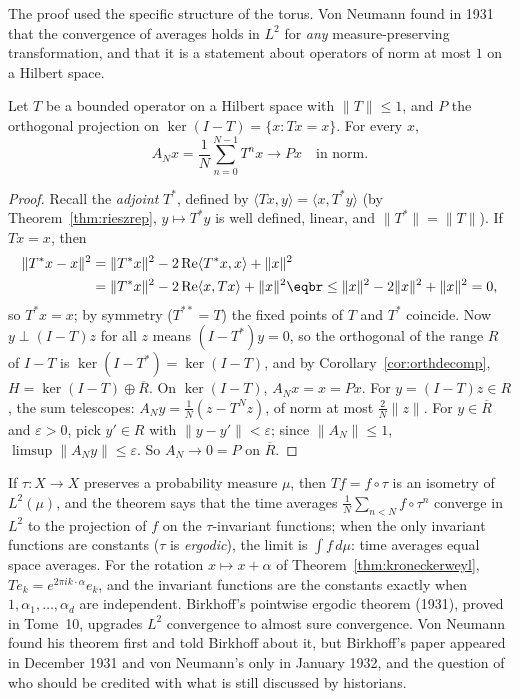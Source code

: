 The proof used the specific structure of the torus. Von Neumann found in 1931 that the convergence of averages holds in $L^2$ for \emph{any} measure-preserving transformation, and that it is a statement about operators of norm
at most $1$ on a Hilbert space.

\begin{theorem}\label{thm:meanergodic}
Let $T$ be a bounded operator on a Hilbert space with $\|T\|\le1$, and $P$ the orthogonal projection on $\ker(I-T)=\{x:Tx=x\}$. For every $x$,
\[A_Nx=\frac1N\sum_{n=0}^{N-1}T^nx\longrightarrow Px\quad\text{in norm}.\]
\end{theorem}
\begin{proof}
Recall the \emph{adjoint} $T^*$, defined by $\langle Tx,y\rangle=\langle x,T^*y\rangle$ (by Theorem~\ref{thm:rieszrep}, $y\mapsto T^*y$ is well defined, linear, and $\|T^*\|=\|T\|$). If $Tx=x$, then
\[\begin{aligned}\|T^*x-x\|^2&=\|T^*x\|^2-2\operatorname{Re}\langle T^*x,x\rangle+\|x\|^2\\&=\|T^*x\|^2-2\operatorname{Re}\langle x,Tx\rangle+\|x\|^2\eqbr\le\|x\|^2-2\|x\|^2+\|x\|^2=0,\end{aligned}\]
so $T^*x=x$; by symmetry ($T^{**}=T$) the fixed points of $T$ and $T^*$ coincide. Now $y\perp(I-T)z$ for all $z$ means $(I-T^*)y=0$, so the orthogonal of the range $R$ of $I-T$ is $\ker(I-T^*)=\ker(I-T)$, and by
Corollary~\ref{cor:orthdecomp}, $H=\ker(I-T)\oplus\overline R$. On $\ker(I-T)$, $A_Nx=x=Px$. For $y=(I-T)z\in R$, the sum telescopes: $A_Ny=\frac1N(z-T^Nz)$, of norm at most $\frac2N\|z\|$. For $y\in\overline R$ and
$\varepsilon>0$, pick $y'\in R$ with $\|y-y'\|<\varepsilon$; since $\|A_N\|\le1$, $\limsup\|A_Ny\|\le\varepsilon$. So $A_N\to0=P$ on $\overline R$.
\end{proof}

If $\tau:X\to X$ preserves a probability measure $\mu$, then $Tf=f\circ\tau$ is an isometry of $L^2(\mu)$, and the theorem says that the time averages $\frac1N\sum_{n<N}f\circ\tau^n$ converge in $L^2$ to the projection of $f$ on the
$\tau$-invariant functions; when the only invariant functions are constants ($\tau$ is \emph{ergodic}), the limit is $\int f\,d\mu$: time averages equal space averages. For the rotation $x\mapsto x+\alpha$ of
Theorem~\ref{thm:kroneckerweyl}, $Te_k=e^{2\pi ik\cdot\alpha}e_k$, and the invariant functions are the constants exactly when $1,\alpha_1,\dots,\alpha_d$ are independent. Birkhoff's pointwise ergodic theorem (1931), proved
in Tome~10, upgrades $L^2$ convergence to almost sure convergence. Von Neumann found his theorem first and told Birkhoff about it, but Birkhoff's paper appeared in December 1931 and von Neumann's only in January 1932, and the question of who should be credited with what is still discussed by historians.

